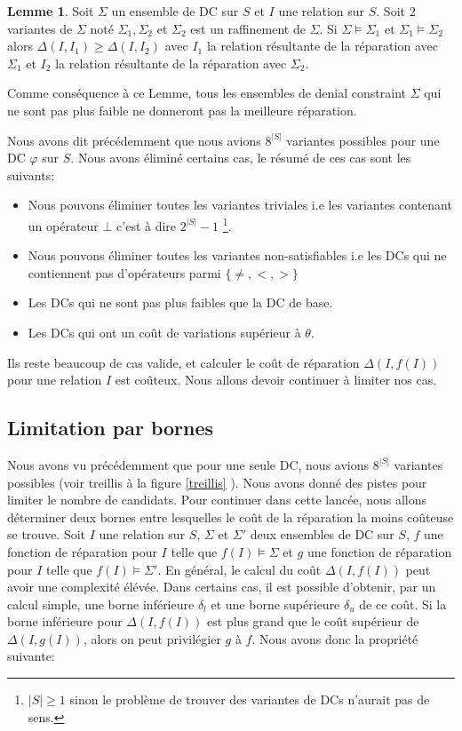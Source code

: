 \documentclass[letterpaper, 12pt]{report}
\theoremstyle{definition}
\newtheorem{mylemma}{Lemme}
\begin{document}
\begin{mylemma}
 Soit $\Sigma$ un ensemble de DC sur $S$ et $I$ une relation sur $S$. Soit 2 variantes de $\Sigma$ noté $\Sigma_1,\Sigma_2$ et $\Sigma_2$ est un raffinement de $\Sigma$. Si $\Sigma \models \Sigma_1$ et $\Sigma_1 \models \Sigma_2$ alors $\Delta(I,I_1) \geq \Delta(I,I_2)$ avec $I_1$ la relation résultante de la réparation avec $\Sigma_1$ et $I_2$ la relation résultante de la réparation avec $\Sigma_2$.
\end{mylemma}

Comme conséquence à ce Lemme, tous les ensembles de denial constraint $\Sigma$ qui ne sont pas plus faible ne donneront pas la meilleure réparation.

Nous avons dit précédemment que nous avions $8^{|S|}$ variantes possibles pour une DC $\varphi$ sur $S$. Nous avons éliminé certains cas, le résumé de ces cas sont les suivants:
\begin{itemize}
\item Nous pouvons éliminer toutes les variantes triviales i.e les variantes contenant un opérateur $\bot$ c'est à dire $2^{|S|}-1$ \footnote{$|S| \geq 1$ sinon le problème de trouver des variantes de DCs n'aurait pas de sens. }.
\item Nous pouvons éliminer toutes les variantes non-satisfiables i.e les DCs qui ne contiennent pas d'opérateurs parmi $\{\neq,<,> \}$
\item Les DCs qui ne sont pas plus faibles que la DC de base.
\item Les DCs qui ont un coût de variations supérieur à $\theta$.
\end{itemize}

Ils reste beaucoup de cas valide, et calculer le coût de réparation $\Delta(I,f(I))$ pour une relation $I$ est coûteux. Nous allons devoir continuer à limiter nos cas.

\subsection{Limitation par bornes}

Nous avons vu précédemment que pour une seule DC, nous avions $8^{|S|}$ variantes possibles (voir treillis à la figure \ref{treillis} ). Nous avons donné des pistes pour limiter le nombre de candidats. Pour continuer dans cette lancée, nous allons déterminer deux bornes entre lesquelles le coût de la réparation la moins coûteuse se trouve. Soit $I$ une relation sur $S$, $\Sigma$ et $\Sigma'$ deux ensembles de DC sur $S$, $f$ une fonction de réparation pour $I$ telle que $f(I)\models \Sigma$ et  $g$ une fonction de réparation pour $I$ telle que $f(I)\models \Sigma'$. En général, le calcul du coût $\Delta(I,f(I))$ peut avoir une complexité élévée. Dans certains cas, il est possible d'obtenir, par un calcul simple,  une borne inférieure $\delta_l$ et une borne supérieure $\delta_u$ de ce coût.  Si la borne inférieure pour $\Delta(I,f(I))$ est plus grand que le coût supérieur de $\Delta(I,g(I))$, alors on peut privilégier $g$ à $f$. Nous avons donc la propriété suivante:
\end{document}
